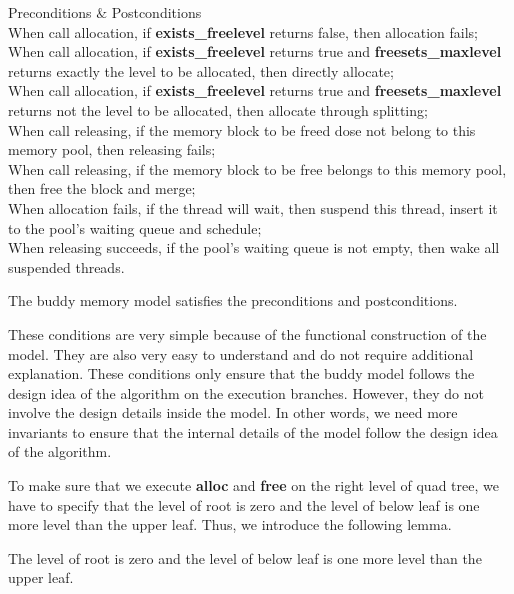 \documentclass[runningheads]{llncs}
\begin{document}
\begin{definition} {Preconditions $\&$ Postconditions} \\
When call allocation, if \textbf{exists\_freelevel} returns false, then allocation fails; \\
When call allocation, if \textbf{exists\_freelevel} returns true and \textbf{freesets\_maxlevel} returns exactly the level to be allocated, then directly allocate; \\
When call allocation, if \textbf{exists\_freelevel} returns true and \textbf{freesets\_maxlevel} returns not the level to be allocated, then allocate through splitting; \\
When call releasing, if the memory block to be freed dose not belong to this memory pool, then releasing fails; \\
When call releasing, if the memory block to be free belongs to this memory pool, then free the block and merge; \\
When allocation fails, if the thread will wait, then suspend this thread, insert it to the pool's waiting queue and schedule; \\
When releasing succeeds, if the pool's waiting queue is not empty, then wake all suspended threads.
\end{definition}

\begin{theorem}
The buddy memory model satisfies the preconditions and postconditions.
\end{theorem}

These conditions are very simple because of the functional construction of the model. They are also very easy to understand and do not require additional explanation. These conditions only ensure that the buddy model follows the design idea of the algorithm on the execution branches. However, they do not involve the design details inside the model. In other words, we need more invariants to ensure that the internal details of the model follow the design idea of the algorithm.

To make sure that we execute \textbf{alloc} and \textbf{free} on the right level of quad tree, we have to specify that the level of root is zero and the level of below leaf is one more level than the upper leaf. Thus, we introduce the following lemma.

\begin{lemma}
	The level of root is zero and the level of below leaf is one more level than the upper leaf.
\end{lemma}
\end{document}
